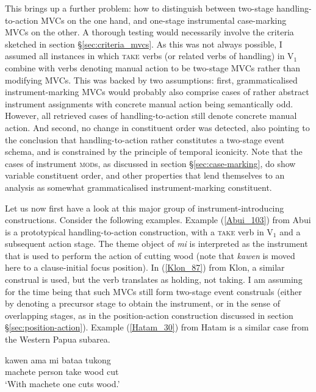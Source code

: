 This brings up a further problem: how to distinguish between two-stage handling-to-action MVCs on the one hand, and one-stage instrumental case-marking MVCs on the other. A thorough testing would necessarily involve the criteria sketched in section §\ref{sec:criteria_mvcs}. As this was not always possible, I assumed all instances in which \textsc{take} verbs (or related verbs of handling) in V$_1$ combine with verbs denoting manual action to be two-stage MVCs rather than modifying MVCs. This was backed by two assumptions: first, grammaticalised instrument-marking MVCs would probably also comprise cases of rather abstract instrument assignments with concrete manual action being semantically odd. However, all retrieved cases of handling-to-action still denote concrete manual action. And second, no change in constituent order was detected, also pointing to the conclusion that handling-to-action rather constitutes a two-stage event schema, and is constrained by the principle of temporal iconicity. Note that the cases of instrument \textsc{mod}s, as discussed in section §\ref{sec:case-marking}, do show variable constituent order, and other properties that lend themselves to an analysis as somewhat grammaticalised instrument-marking constituent.

Let us now first have a look at this major group of instrument-introducing constructions. Consider the following examples. Example (\ref{Abui_103}) from Abui is a prototypical handling-to-action construction, with a \textsc{take} verb in V$_1$ and a subsequent action stage. The theme object of \textit{mi} is interpreted as the instrument that is used to perform the action of cutting wood (note that \textit{kawen} is moved here to a clause-initial focus position). In (\ref{Klon_87}) from Klon, a similar construal is used, but the verb translates as holding, not taking. I am assuming for the time being that such MVCs still form two-stage event construals (either by denoting a precursor stage to obtain the instrument, or in the sense of overlapping stages, as in the position-action construction discussed in section §\ref{sec:position-action}). Example (\ref{Hatam_30}) from Hatam is a similar case from the Western Papua subarea.

\ea \label{Abui_103}
\gll kawen ama mi bataa tukong \\
machete person take wood cut \\
\glft `With machete one cuts wood.' \\ 
\z
\xe

